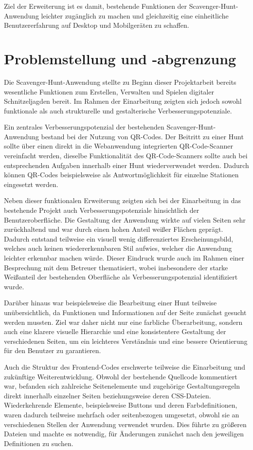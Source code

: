 ﻿\documentclass[oneside]{ausarbeitung}
\begin{document}
Ziel der Erweiterung ist es damit, bestehende Funktionen der Scavenger-Hunt-Anwendung leichter zugänglich zu machen und gleichzeitig eine 
einheitliche Benutzererfahrung auf Desktop und Mobilgeräten zu schaffen.

\section{Problemstellung und -abgrenzung}
\label{sec:problemstellung}

Die Scavenger-Hunt-Anwendung stellte zu Beginn dieser Projektarbeit bereits wesentliche Funktionen zum Erstellen, Verwalten und Spielen digitaler
Schnitzeljagden bereit. Im Rahmen der Einarbeitung zeigten sich jedoch sowohl funktionale als auch strukturelle und gestalterische 
Verbesserungspotenziale.

Ein zentrales Verbesserungspotenzial der bestehenden Scavenger-Hunt-Anwendung bestand bei der Nutzung von QR-Codes. Der Beitritt zu einer Hunt
sollte über einen direkt in die Webanwendung integrierten QR-Code-Scanner vereinfacht werden, dieselbe Funktionalität des QR-Code-Scanners sollte 
auch bei entsprechenden Aufgaben innerhalb einer Hunt wiederverwendet werden. Dadurch können QR-Codes beispielsweise als Antwortmöglichkeit 
für einzelne Stationen eingesetzt werden.

Neben dieser funktionalen Erweiterung zeigten sich bei der Einarbeitung in das bestehende Projekt auch Verbesserungspotenziale hinsichtlich 
der Benutzeroberfläche. Die Gestaltung der Anwendung wirkte auf vielen Seiten sehr zurückhaltend und war durch einen hohen Anteil weißer Flächen 
geprägt. Dadurch entstand teilweise ein visuell wenig differenziertes Erscheinungsbild, welches auch keinen wiedererkennbaren Stil aufwies, welcher
die Anwendung leichter erkennbar machen würde. Dieser Eindruck wurde auch im Rahmen einer Besprechung mit dem Betreuer thematisiert, wobei 
insbesondere der starke Weißanteil der bestehenden Oberfläche als Verbesserungspotenzial identifiziert wurde.

Darüber hinaus war beispielsweise die Bearbeitung einer Hunt teilweise unübersichtlich, da Funktionen und Informationen auf der Seite zunächst 
gesucht werden mussten. Ziel war daher nicht nur eine farbliche Überarbeitung, sondern auch eine klarere visuelle Hierarchie und eine konsistentere 
Gestaltung der verschiedenen Seiten, um ein leichteres Verständnis und eine bessere Orientierung für den Benutzer zu garantieren.

Auch die Struktur des Frontend-Codes erschwerte teilweise die Einarbeitung und zukünftige Weiterentwicklung. Obwohl der bestehende Quellcode 
kommentiert war, befanden sich zahlreiche Seitenelemente und zugehörige Gestaltungsregeln direkt innerhalb einzelner Seiten beziehungsweise deren 
CSS-Dateien. Wiederkehrende Elemente, beispielsweise Buttons und deren Farbdefinitionen, waren dadurch teilweise mehrfach oder seitenbezogen 
umgesetzt, obwohl sie an verschiedenen Stellen der Anwendung verwendet wurden. Dies führte zu größeren Dateien und machte es notwendig, für Änderungen 
zunächst nach den jeweiligen Definitionen zu suchen.
\end{document}
